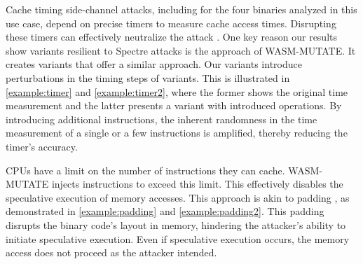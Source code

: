 \begin{strategy}
    Cache timing side-channel attacks, including for the four binaries analyzed in this use case, depend on precise timers to measure cache access times. 
    Disrupting these timers can effectively neutralize the attack \cite{JStimers}.  
    One key reason our results show variants resilient to Spectre attacks is the approach of WASM-MUTATE. 
    It creates variants that offer a similar approach.
    Our \Wasm variants introduce perturbations in the timing steps of \Wasm variants. 
    This is illustrated in \autoref{example:timer} and \autoref{example:timer2}, where the former shows the original time measurement and the latter presents a variant with introduced operations.
    By introducing additional instructions, the inherent randomness in the time measurement of a single or a few instructions is amplified, thereby reducing the timer's accuracy.

\end{strategy}



\begin{strategy}
    CPUs have a limit on the number of instructions they can cache. 
    WASM-MUTATE injects instructions to exceed this limit. 
    This effectively disables the speculative execution of memory accesses.
    This approach is akin to padding \cite{padding}, as demonstrated in \autoref{example:padding} and \autoref{example:padding2}.
    This padding disrupts the binary code's layout in memory, hindering the attacker's ability to initiate speculative execution. 
    Even if speculative execution occurs, the memory access does not proceed as the attacker intended.
    
\end{strategy}




    

